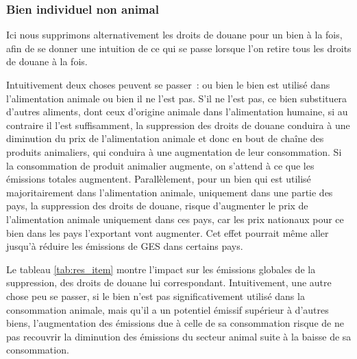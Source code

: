 \subsubsection{Bien individuel non animal}

Ici nous supprimons alternativement les droits de douane pour un bien à la fois, afin de se donner une intuition de ce qui se passe lorsque l'on retire tous les droits de douane à la fois.

Intuitivement deux choses peuvent se passer~: ou bien le bien est utilisé dans l'alimentation animale ou bien il ne l'est pas. S'il ne l'est pas, ce bien substituera d'autres aliments, dont ceux d'origine animale dans l'alimentation humaine, si au contraire il l'est suffisamment, la suppression des droits de douane conduira à une diminution du prix de l'alimentation animale et donc en bout de chaîne des produits animaliers, qui conduira à une augmentation de leur consommation. Si la consommation de produit animalier augmente, on s'attend à ce que les émissions totales augmentent. Parallèlement, pour un bien qui est utilisé majoritairement dans l'alimentation animale, uniquement dans une partie des pays, la suppression des droits de douane, risque d'augmenter le prix de l'alimentation animale uniquement dans ces pays, car les prix nationaux pour ce bien dans les pays l'exportant vont augmenter. Cet effet pourrait même aller jusqu'à réduire les émissions de GES dans certains pays.

Le tableau \ref{tab:res_item} montre l'impact sur les émissions globales de la suppression, des droits de douane lui correspondant. Intuitivement, une autre chose peu se passer, si le bien n'est pas significativement utilisé dans la consommation animale, mais qu'il a un potentiel émissif supérieur à d'autres biens, l'augmentation des émissions due à celle de sa consommation risque de ne pas recouvrir la diminution des émissions du secteur animal suite à la baisse de sa consommation.

